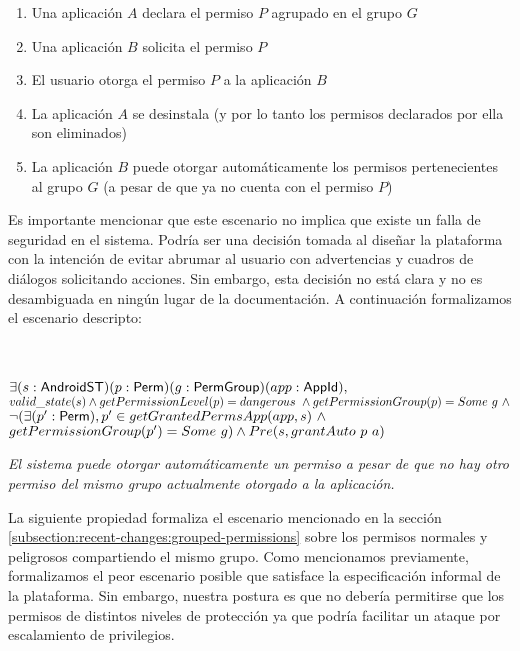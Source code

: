 \begin{enumerate}
    \item Una aplicación $A$ declara el permiso $P$ agrupado en el grupo $G$
    \item Una aplicación $B$ solicita el permiso $P$
    \item El usuario otorga el permiso $P$ a la aplicación $B$
    \item La aplicación $A$ se desinstala (y por lo tanto los permisos declarados por ella son eliminados)
    \item La aplicación $B$ puede otorgar automáticamente los permisos pertenecientes al grupo $G$ (a
    pesar de que ya no cuenta con el permiso $P$)
\end{enumerate}

Es importante mencionar que este escenario no implica que existe un falla de seguridad en el sistema.
Podría ser una decisión tomada al diseñar la plataforma con la intención de evitar abrumar al usuario
con advertencias y cuadros de diálogos solicitando acciones. Sin embargo, esta decisión no está clara
y no es desambiguada en ningún lugar de la documentación. A continuación formalizamos el
escenario descripto:

\begin{prop} \label{section:formalization:property2}
    \mbox{} \\ \\
   $\exists (s:\mathsf{AndroidST}) (p:\mathsf{Perm}) (g:\mathsf{PermGroup}) (app:\mathsf{AppId}),$
   $valid\_state(s) \land \\
   getPermissionLevel(p) = dangerous~ \land
   getPermissionGroup(p) = Some\ g\ \land$
   $\neg (\exists (p': \mathsf{Perm}), p' \in getGrantedPermsApp(app,s)~ \land$ \\
   $ getPermissionGroup(p') = Some\ g) \land Pre(s, grantAuto~p~a) \\ \\$

   \textit{El sistema puede otorgar automáticamente un permiso a pesar de que no hay otro permiso del mismo grupo actualmente otorgado a la aplicación.}
\end{prop}


La siguiente propiedad formaliza el escenario mencionado en la sección
\ref{subsection:recent-changes:grouped-permissions} sobre los permisos normales y peligrosos
compartiendo el  mismo grupo. Como mencionamos previamente, formalizamos el peor escenario posible que
satisface la especificación informal de la plataforma. Sin embargo, nuestra postura es que no debería
permitirse que los permisos de distintos niveles de protección ya que podría facilitar un ataque por
escalamiento de privilegios.


